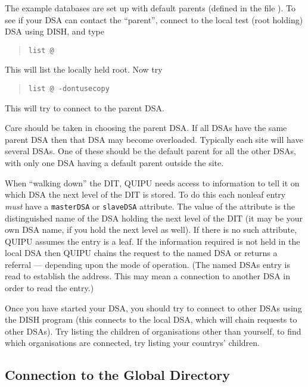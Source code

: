 The example databases are set up with default parents (defined in the file
).
To see if your DSA can contact the ``parent'', connect to
the local test (root holding) DSA using DISH, and type

\begin{quote}\begin{verbatim}
list @
\end{verbatim}\end{quote}
This will list the locally held root. Now try

\begin{quote}\begin{verbatim}
list @ -dontusecopy
\end{verbatim}\end{quote}
This will try to connect to the parent DSA.

Care should be taken in choosing the parent
DSA. If all DSAs have the same parent
DSA then that DSA may become overloaded.
Typically each site will have several DSAs. One of these should
be the default parent for all the other DSAs, with only one DSA having a 
default parent outside the site.


When ``walking down'' the DIT, QUIPU needs access to information to tell it
on which DSA the next level of the DIT is stored.
To do this each nonleaf entry {\em must} have a \verb+masterDSA+
or \verb+slaveDSA+
attribute.  The value of the attribute is the distinguished name of the DSA
holding the next level of the DIT (it may be your own DSA name, if you hold
the next level as well).  If there is no such attribute, QUIPU assumes the
entry is a leaf.
If the information required is not held in the local DSA then QUIPU
chains the request to the named DSA or returns a referral 
--- depending upon the mode of operation.
(The named DSAs entry is read to establish the
address. This may mean a connection to another DSA 
in order to read the entry.)

Once you have started your DSA, you should try to connect to other DSAs 
using the DISH program (this connects to the local DSA, which will
chain requests to other DSAs).  Try listing the children of
organisations other than yourself, to find which organisations are connected,
try listing your countrys' children.

\subsection {Connection to the Global Directory}\label{dsa:global}


